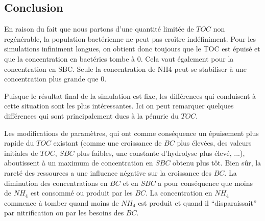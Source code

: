\subsection{Conclusion}
\par{
En raison du fait que nous partons d'une quantité limitée de $TOC$ non regénérable, la population bactérienne
ne peut pas croître indéfiniment.
Pour les simulations infiniment longues, on obtient donc toujours que le TOC est épuisé et que la
concentration en bactéries tombe à $0$. Cela vaut également pour la concentration en SBC.
Seule la concentration de NH4 peut se stabiliser à une concentration plus grande que $0$.
}
\par{
Puisque le résultat final de la simulation est fixe, les différences qui conduisent à cette situation
sont les plus intéressantes. Ici on peut remarquer quelques différences qui sont principalement dues à
la pénurie du $TOC$.
}
\par{
Les modifications de paramètres, qui ont comme conséquence un épuisement plus rapide du $TOC$ existant
(comme une croissance de $BC$ plus élevées, des valeurs initiales de $TOC$, $SBC$ plus faibles, une
constante d'hydrolyse plus élevé, ...), aboutissent à un maximum de concentration en $SBC$ obtenu plus tôt. Bien sûr, la rareté des ressources a une influence n\'egative sur la croissance des $BC$.
La diminution des concentrations en $BC$ et en $SBC$ a pour conséquence que moins de $NH_4$ est consomm\'e ou
produit par les $BC$. La concentration en $NH_4$ commence à tomber quand moins de $NH_4$ est produit et quand il
``disparaissait'' par nitrification ou par les besoins des $BC$.
}
